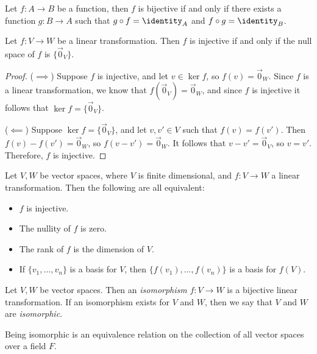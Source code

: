 \documentclass[12pt]{article}
\begin{document}
\begin{thm}
    Let $f: A \to B$ be a function, then $f$ is bijective if and only if there exists a function $g: B \to A$ such that $g \circ f = \identity_A$ and $f \circ g = \identity_B$.
\end{thm}

\begin{lemma}
    Let $f: V \to W$ be a linear transformation. Then $f$ is injective if and only if the null space of $f$ is $\{\vec{0}_V\}$.
\end{lemma}

\begin{proof}\proofbreak
    ($\implies$) Suppose $f$ is injective, and let $v \in \ker f$, so $f(v) = \vec{0}_W$. Since $f$ is a linear transformation, we know that $f(\vec{0}_V) = \vec{0}_W$, and since $f$ is injective it follows that $\ker f = \{\vec{0}_V\}$.

    ($\impliedby$) Suppose $\ker f = \{\vec{0}_V\}$, and let $v, v' \in V$ such that $f(v) = f(v')$. Then $f(v) - f(v') = \vec{0}_W$, so $f(v - v') = \vec{0}_W$. It follows that $v - v' = \vec{0}_V$, so $v = v'$. Therefore, $f$ is injective.
\end{proof}

\begin{cor}\label{injective-nullity-rank}
    Let $V, W$ be vector spaces, where $V$ is finite dimensional, and $f: V \to W$ a linear transformation. Then the following are all equivalent:
    \begin{itemize}
        \item $f$ is injective.
        \item The nullity of $f$ is zero.
        \item The rank of $f$ is the dimension of $V$.
        \item If $\{v_1, \ldots, v_n\}$ is a basis for $V$, then $\{f(v_1), \ldots, f(v_n)\}$ is a basis for $f(V)$.
    \end{itemize}
\end{cor}

\begin{defn}
    Let $V, W$ be vector spaces. Then an \emph{isomorphism} $f: V \to W$ is a bijective linear transformation. If an isomorphism exists for $V$ and $W$, then we say that $V$ and $W$ are \emph{isomorphic}.
\end{defn}

\begin{rmk}
    Being isomorphic is an equivalence relation on the collection of all vector spaces over a field $F$.
\end{rmk}
\end{document}
